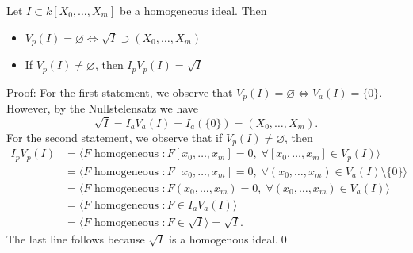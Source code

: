 \begin{dang}
    \begin{theorem}\label{theorem: projective Nullstelensatz}
        Let $I\subset k[X_0,\dots,X_m]$ be a homogeneous ideal. Then 
        \begin{itemize}
            \item[(1)] $V_p(I)=\varnothing\iff \sqrt{I}\supset (X_0,\dots,X_m)$
            \item[(2)] If $V_p(I)\neq\varnothing$, then $I_pV_p(I)=\sqrt{I}$ 
        \end{itemize}
    \end{theorem}
\end{dang}
Proof: For the first statement, we observe that 
$V_p(I)=\varnothing\iff V_a(I)=\{0\}$. However, by the Nullstelensatz we have 
\begin{equation}
    \sqrt{I} = I_aV_a(I)=I_a(\{0\})=(X_0,\dots,X_m).
\end{equation}
For the second statement, we observe that if $V_p(I)\neq\varnothing$, then 
\begin{equation}
    \begin{split}
        I_pV_p(I)&=\langle F\text{ homogeneous }: F[x_0,\dots,x_m]=0,\;\forall [x_0,\dots,x_m]\in V_p(I)\rangle\\
         &=\langle F\text{ homogeneous }: F[x_0,\dots,x_m]=0,\;\forall (x_0,\dots,x_m)\in V_a(I)\setminus\{0\}\rangle\\
         &=\langle F\text{ homogeneous }: F(x_0,\dots,x_m)=0,\;\forall (x_0,\dots,x_m)\in V_a(I) \rangle\\
         &=\langle F\text{ homogeneous }: F\in I_aV_a(I)\rangle\\
         &=\langle F\text{ homogeneous }: F\in \sqrt{I}\rangle = \sqrt{I}.
    \end{split}
\end{equation}
The last line follows because $\sqrt{I}$ is a homogenous ideal.\qed

